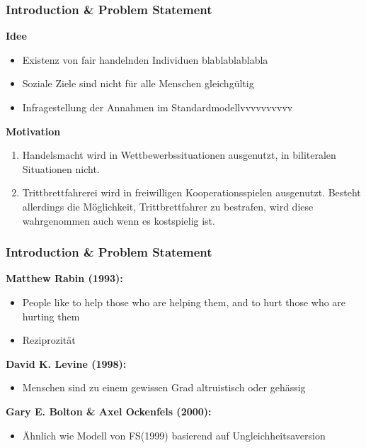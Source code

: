\documentclass[10pt, compress]{beamer}
\begin{document}
\begin{frame}[fragile]
  \frametitle{Introduction \& Problem Statement}
  \textbf{Idee}
      \begin{itemize}
        \item Existenz von fair handelnden Individuen blablablablabla \item Soziale Ziele sind nicht für alle Menschen gleichgültig \item Infragestellung der Annahmen im Standardmodellvvvvvvvvvv
      \end{itemize}
   
   \textbf{Motivation} 
   
   \begin{enumerate}
        \item Handelsmacht wird  in Wettbewerbssituationen ausgenutzt,
        in biliteralen Situationen nicht. 
        \item Trittbrettfahrerei wird in freiwilligen Kooperationsspielen ausgenutzt.
        Besteht allerdings die Möglichkeit, Trittbrettfahrer zu bestrafen, wird diese 
        wahrgenommen auch wenn es kostspielig ist.
      \end{enumerate}
   

   
   
\end{frame}




\begin{frame}[fragile]
  \frametitle{Introduction \& Problem Statement}


\textbf{\alert{Matthew Rabin (1993):}}
\begin{itemize}
\item People like to help those who are helping them, and to hurt those who are hurting them
\item Reziprozität
\end{itemize}

\textbf{\alert{David K. Levine (1998):} }
\begin{itemize}

\item Menschen sind zu einem gewissen Grad altruistisch oder gehässig
\end{itemize}

\textbf{\alert{Gary E. Bolton \& Axel Ockenfels (2000):}}
\begin{itemize}
 \item Ähnlich wie Modell von FS(1999) basierend auf Ungleichheitsaversion 

\end{itemize}

\end{frame}
\end{document}
